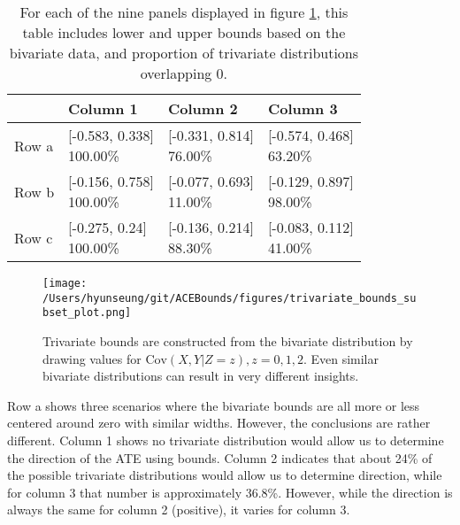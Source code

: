 \documentclass[
]{article}
\theoremstyle{plain}
\begin{document}
\begin{table}[H]
  \center
  \caption{For each of the nine panels displayed in figure \ref{fig:trivariate_bounds}, this table includes lower and upper bounds based on the bivariate data, and proportion of trivariate distributions overlapping 0.}
  \label{tab:subset_plot_summaries_a}
  
\begin{tabular}{llll}
\toprule
  & Column 1 & Column 2 & Column 3\\
\midrule
Row a & \makecell[l]{[-0.583, 0.338]\\100.00\%} & \makecell[c]{[-0.331, 0.814]\\76.00\%} & \makecell[r]{[-0.574, 0.468]\\63.20\%}\\
Row b & \makecell[l]{[-0.156, 0.758]\\100.00\%} & \makecell[c]{[-0.077, 0.693]\\11.00\%} & \makecell[r]{[-0.129, 0.897]\\98.00\%}\\
Row c & \makecell[l]{[-0.275, 0.24]\\100.00\%} & \makecell[c]{[-0.136, 0.214]\\88.30\%} & \makecell[r]{[-0.083, 0.112]\\41.00\%}\\
\bottomrule
\end{tabular}


\end{table}

\begin{figure}[H]
  \center
  \texttt{[image: /Users/hyunseung/git/ACEBounds/figures/trivariate\_bounds\_subset\_plot.png]}
  \caption{Trivariate bounds are constructed from the bivariate distribution by drawing values for $\text{Cov}(X,Y|Z=z),z=0,1,2$. Even similar bivariate distributions can result in very different insights.}
  \label{fig:trivariate_bounds}
\end{figure}

Row a shows three scenarios where the bivariate bounds are all more or less centered around zero with similar widths. However, the conclusions are rather different. Column 1 shows no trivariate distribution would allow us to determine the direction of the ATE using bounds. Column 2 indicates that about 24\% of the possible trivariate distributions would allow us to determine direction, while for column 3 that number is approximately 36.8\%. However, while the direction is always the same for column 2 (positive), it varies for column 3.
\end{document}

